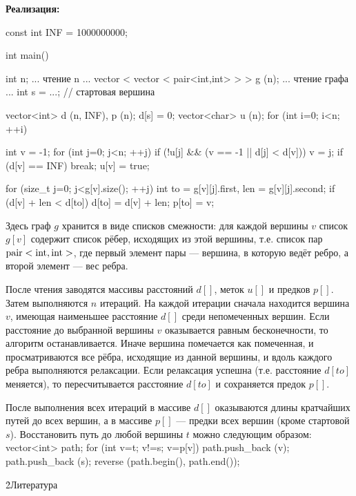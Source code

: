 \bf{Реализация}:

\code
const int INF = 1000000000;

int main() {
	int n;
	... чтение n ...
	vector < vector < pair<int,int> > > g (n);
	... чтение графа ...
	int s = ...; // стартовая вершина

	vector<int> d (n, INF),  p (n);
	d[s] = 0;
	vector<char> u (n);
	for (int i=0; i<n; ++i) {
		int v = -1;
		for (int j=0; j<n; ++j)
			if (!u[j] && (v == -1 || d[j] < d[v]))
				v = j;
		if (d[v] == INF)
			break;
		u[v] = true;

		for (size_t j=0; j<g[v].size(); ++j) {
			int to = g[v][j].first,
				len = g[v][j].second;
			if (d[v] + len < d[to]) {
				d[to] = d[v] + len;
				p[to] = v;
			}
		}
	}
}
\endcode

Здесь граф $g$ хранится в виде списков смежности: для каждой вершины $v$ список $g[v]$ содержит список рёбер, исходящих из этой вершины, т.е. список пар $\rm pair<int,int>$, где первый элемент пары --- вершина, в которую ведёт ребро, а второй элемент --- вес ребра.

После чтения заводятся массивы расстояний $d[]$, меток $u[]$ и предков $p[]$. Затем выполняются $n$ итераций. На каждой итерации сначала находится вершина $v$, имеющая наименьшее расстояние $d[]$ среди непомеченных вершин. Если расстояние до выбранной вершины $v$ оказывается равным бесконечности, то алгоритм останавливается. Иначе вершина помечается как помеченная, и просматриваются все рёбра, исходящие из данной вершины, и вдоль каждого ребра выполняются релаксации. Если релаксация успешна (т.е. расстояние $d[to]$ меняется), то пересчитывается расстояние $d[to]$ и сохраняется предок $p[]$.

После выполнения всех итераций в массиве $d[]$ оказываются длины кратчайших путей до всех вершин, а в массиве $p[]$ --- предки всех вершин (кроме стартовой $s$). Восстановить путь до любой вершины $t$ можно следующим образом:
\code
vector<int> path;
for (int v=t; v!=s; v=p[v])
	path.push_back (v);
path.push_back (s);
reverse (path.begin(), path.end());
\endcode

\h2{Литература}

\ul{
\li {}
\li {}
}
